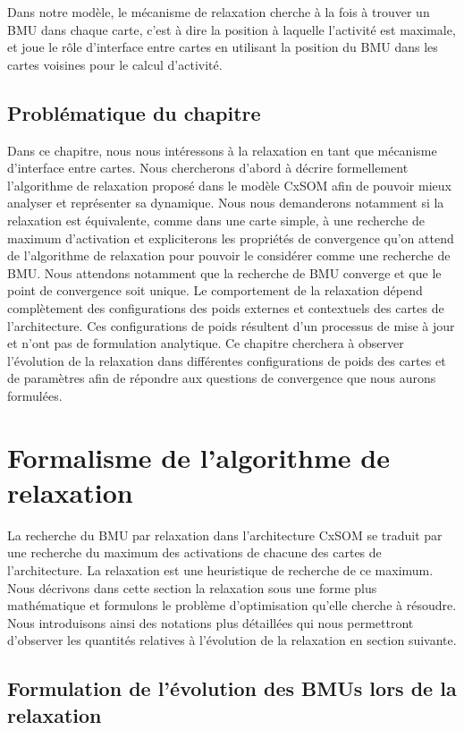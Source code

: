 \documentclass[../main]{subfiles}
\begin{document}
Dans notre modèle, le mécanisme de relaxation cherche à la fois à trouver un BMU dans chaque carte, c'est à  dire la position à laquelle l'activité est maximale, et joue le rôle d'interface entre cartes en utilisant la position du BMU dans les cartes voisines pour le calcul d'activité. 

\subsection{Problématique du chapitre}

Dans ce chapitre, nous nous intéressons à la relaxation en tant que mécanisme d'interface entre cartes.
Nous chercherons d'abord à décrire formellement l'algorithme de relaxation proposé dans le modèle CxSOM afin de pouvoir mieux analyser et représenter sa dynamique. Nous nous demanderons notamment si la relaxation est équivalente, comme dans une carte simple, à une recherche de maximum d'activation et expliciterons les propriétés de convergence qu'on attend de l'algorithme de relaxation pour pouvoir le considérer comme une recherche de BMU. Nous attendons notamment que la recherche de BMU converge et que le point de convergence soit unique.
Le comportement de la relaxation dépend complètement des configurations des poids externes et contextuels des cartes de l'architecture. Ces configurations de poids résultent d'un processus de mise à jour et n'ont pas de formulation analytique.
Ce chapitre cherchera à observer l'évolution de la relaxation dans différentes configurations de poids des cartes et de paramètres afin de répondre aux questions de convergence que nous aurons formulées.

\section{Formalisme de l'algorithme de relaxation}

La recherche du BMU par relaxation dans l'architecture CxSOM se traduit par une recherche du maximum des activations de chacune des cartes de l'architecture.
La relaxation est une heuristique de recherche de ce maximum.
Nous décrivons dans cette section la relaxation sous une forme plus mathématique et formulons le problème d'optimisation qu'elle cherche à résoudre. Nous introduisons ainsi des notations plus détaillées qui nous permettront d'observer les quantités relatives à l'évolution de la relaxation en section suivante.

\subsection{Formulation de l'évolution des BMUs lors de la relaxation}
\end{document}
